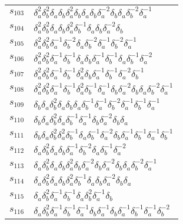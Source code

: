 \documentclass{article}
\begin{document}
\begin{center}
\begin{tabular}{ll}
$s_{103}$ & $\delta_a^{2}\delta_b^{2}\delta_a^{}\delta_b^{}\delta_a^{2}\delta_b^{}\delta_a^{}\delta_b^{}\delta_a^{-2}\delta_b^{}\delta_a^{}\delta_b^{-2}\delta_a^{-1}$ \\
$s_{104}$ & $\delta_a^{2}\delta_b^{2}\delta_a^{}\delta_b^{}\delta_a^{2}\delta_b^{-1}\delta_a^{}\delta_b^{}\delta_a^{-2}\delta_b^{}$ \\
$s_{105}$ & $\delta_a^{2}\delta_b^{2}\delta_a^{-1}\delta_b^{-2}\delta_a^{}\delta_b^{-2}\delta_a^{-1}\delta_b^{-2}\delta_a^{-1}$ \\
$s_{106}$ & $\delta_a^{2}\delta_b^{2}\delta_a^{-1}\delta_b^{-1}\delta_a^{}\delta_b^{}\delta_a^{-1}\delta_b^{-1}\delta_a^{}\delta_b^{-1}\delta_a^{-2}$ \\
$s_{107}$ & $\delta_a^{2}\delta_b^{2}\delta_a^{-1}\delta_b^{-1}\delta_a^{2}\delta_b^{}\delta_a^{-1}\delta_b^{-1}\delta_a^{-2}\delta_b^{-1}$ \\
$s_{108}$ & $\delta_a^{2}\delta_b^{2}\delta_a^{-1}\delta_b^{-1}\delta_a^{2}\delta_b^{-1}\delta_a^{-1}\delta_b^{}\delta_a^{-2}\delta_b^{}\delta_a^{}\delta_b^{-2}\delta_a^{-1}$ \\
$s_{109}$ & $\delta_b^{}\delta_a^{}\delta_b^{2}\delta_a^{}\delta_b^{}\delta_a^{}\delta_b^{-1}\delta_a^{-1}\delta_b^{-2}\delta_a^{-1}\delta_b^{-1}\delta_a^{-1}$ \\
$s_{110}$ & $\delta_b^{}\delta_a^{}\delta_b^{2}\delta_a^{}\delta_b^{-1}\delta_a^{-1}\delta_b^{}\delta_a^{-2}\delta_b^{}\delta_a^{}$ \\
$s_{111}$ & $\delta_b^{}\delta_a^{}\delta_b^{2}\delta_a^{2}\delta_b^{-1}\delta_a^{}\delta_b^{-1}\delta_a^{-2}\delta_b^{}\delta_a^{-1}\delta_b^{-1}\delta_a^{-1}\delta_b^{-1}$ \\
$s_{112}$ & $\delta_a^{}\delta_b^{2}\delta_a^{}\delta_b^{}\delta_a^{-1}\delta_b^{-2}\delta_a^{}\delta_b^{-1}\delta_a^{-2}$ \\
$s_{113}$ & $\delta_a^{}\delta_b^{2}\delta_a^{}\delta_b^{}\delta_a^{2}\delta_b^{}\delta_a^{-2}\delta_b^{}\delta_a^{-2}\delta_b^{}\delta_a^{}\delta_b^{-2}\delta_a^{-1}$ \\
$s_{114}$ & $\delta_a^{}\delta_b^{2}\delta_a^{}\delta_b^{}\delta_a^{2}\delta_b^{-1}\delta_a^{}\delta_b^{}\delta_a^{-2}\delta_b^{}\delta_a^{}$ \\
$s_{115}$ & $\delta_a^{}\delta_b^{2}\delta_a^{-1}\delta_b^{-1}\delta_a^{}\delta_b^{2}\delta_a^{-1}\delta_b^{}$ \\
$s_{116}$ & $\delta_a^{}\delta_b^{2}\delta_a^{-1}\delta_b^{-1}\delta_a^{-1}\delta_b^{}\delta_a^{-1}\delta_b^{}\delta_a^{-1}\delta_b^{-1}\delta_a^{-1}\delta_b^{-2}$ \\

\end{tabular}
\end{center}
\end{document}
